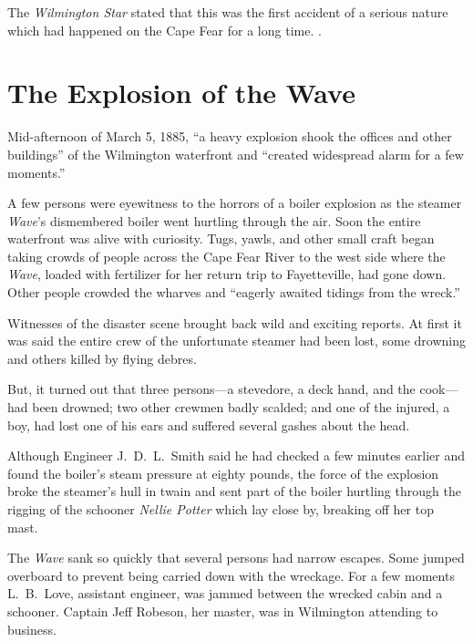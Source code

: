 \documentclass[11pt, a5paper, openright]{book}
\newcommand{\steamer}[1]{\textit{#1}\index{#1,~steamer}}
\begin{document}
The \textit{Wilmington Star} stated that this was the first accident
of a serious nature which had happened on the Cape Fear for a long
time.  \citep[6-7-1884]{ws}.\par

\section{The Explosion of the Wave}

Mid-afternoon of March 5, 1885, ``a heavy explosion shook the offices
and other buildings'' of the Wilmington waterfront and ``created
widespread alarm for a few moments.''\par

A few persons were eyewitness to the horrors of a boiler explosion as
the steamer \steamer{Wave}'s dismembered boiler went hurtling through
the air.  Soon the entire waterfront was alive with curiosity.  Tugs,
yawls, and other small craft began taking crowds of people across the
Cape Fear River to the west side where the \steamer{Wave}, loaded with
fertilizer for her return trip to Fayetteville, had gone down.  Other
people crowded the wharves and ``eagerly awaited tidings from the
wreck.''\par

Witnesses of the disaster scene brought back wild and exciting
reports.  At first it was said the entire crew of the unfortunate
steamer had been lost, some drowning and others killed by flying
debres.\par

But, it turned out that three persons---a stevedore, a deck hand, and
the cook---had been drowned; two other crewmen badly scalded; and one
of the injured, a boy, had lost one of his ears and suffered several
gashes about the head.\par

Although Engineer J.~D.~L.~Smith said he
had checked a few minutes earlier and found the boiler's steam
pressure at eighty pounds, the force of the explosion broke the
steamer's hull in twain and sent part of the boiler hurtling through
the rigging of the schooner
\textit{Nellie Potter} which lay close by,
breaking off her top mast.\par

The \steamer{Wave} sank so quickly that several persons had narrow
escapes.  Some jumped overboard to prevent being carried down with the
wreckage.  For a few moments L.~B.~Love,
assistant engineer, was jammed between the wrecked cabin and a
schooner.  Captain Jeff Robeson, her
master, was in Wilmington attending to business.\par
\end{document}
